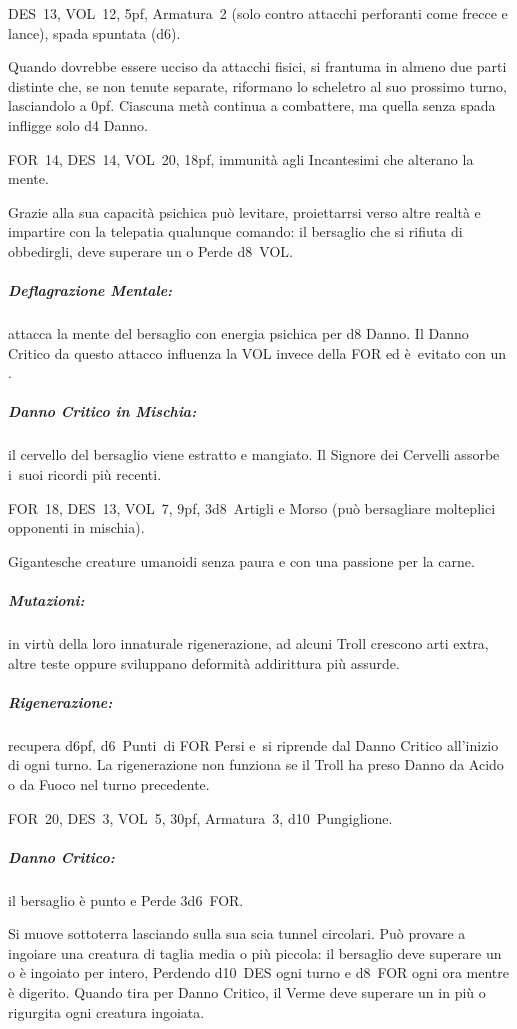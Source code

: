 \documentclass[itdr]{subfiles}
\begin{document}
\vfill

DES~13, VOL~12, 5pf, Armatura~2 (solo contro attacchi perforanti come frecce e lance), spada spuntata (d6).

Quando dovrebbe essere ucciso da attacchi fisici, si frantuma in almeno due parti distinte che, se non tenute separate, riformano lo scheletro al suo prossimo turno, lasciandolo a 0pf. Ciascuna metà continua a combattere, ma quella senza spada infligge solo d4 Danno.

\vfill

FOR~14, DES~14, VOL~20, 18pf, immunità agli Incantesimi che alterano la mente.

Grazie alla sua capacità psichica può levitare, proiettarrsi verso altre realtà e impartire con la telepatia qualunque comando: il bersaglio che si rifiuta di obbedirgli, deve superare un  o Perde d8~VOL.

\subparagraph{Deflagrazione Mentale:} attacca la mente del bersaglio con energia psichica per d8 Danno. Il Danno Critico da questo attacco influenza la VOL invece della FOR ed è~evitato con un .

\subparagraph{Danno Critico in Mischia:} il cervello del bersaglio viene estratto e mangiato. Il Signore dei Cervelli assorbe i~suoi ricordi più recenti.

\vfill

FOR~18, DES~13, VOL~7, 9pf, 3d8~Artigli e Morso (può bersagliare molteplici opponenti in mischia).

Gigantesche creature umanoidi senza paura e con una passione per la carne.

\subparagraph{Mutazioni:} in virtù della loro innaturale rigenerazione, ad alcuni Troll crescono arti extra, altre teste oppure sviluppano deformità addirittura più assurde.

\subparagraph{Rigenerazione:} recupera d6pf, d6~Punti~di FOR Persi e~si riprende dal Danno Critico all'inizio di ogni turno. La rigenerazione non funziona se il Troll ha preso Danno da Acido o da Fuoco nel turno precedente.

\break


FOR~20, DES~3, VOL~5, 30pf, Armatura~3, d10~Pungiglione.

\subparagraph{Danno Critico:} il bersaglio è punto e Perde 3d6~FOR.

Si muove sottoterra lasciando sulla sua scia tunnel circolari. Può provare a ingoiare una creatura di taglia media o più piccola: il bersaglio deve superare un  o è ingoiato per intero, Perdendo d10~DES ogni turno e d8~FOR ogni ora mentre è digerito. Quando tira per Danno Critico, il Verme deve superare un  in più o rigurgita ogni creatura ingoiata.
\end{document}
